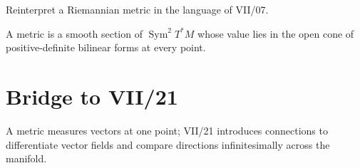 \begin{problem}\label{prob:vii20-ch05}
Reinterpret a Riemannian metric in the language of VII/07.
\end{problem}
\begin{solution}
A metric is a smooth section of \(\operatorname{Sym}^2T^*M\) whose value lies in the open cone of positive-definite bilinear forms at every point.
\end{solution}

\section*{Bridge to VII/21}
A metric measures vectors at one point; VII/21 introduces connections to differentiate vector fields and compare directions infinitesimally across the manifold.
